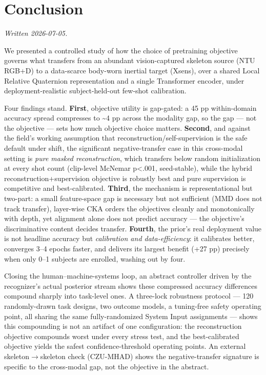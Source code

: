 \section{Conclusion}

\textit{Written 2026-07-05.}

We presented a controlled study of how the choice of pretraining objective governs what transfers from an abundant vision-captured skeleton source (NTU RGB+D) to a data-scarce body-worn inertial target (Xsens), over a shared Local Relative Quaternion representation and a single Transformer encoder, under deployment-realistic subject-held-out few-shot calibration.

Four findings stand. \textbf{First}, objective utility is gap-gated: a 45 pp within-domain accuracy spread compresses to \textasciitilde{}4 pp across the modality gap, so the gap --- not the objective --- sets how much objective choice matters. \textbf{Second}, and against the field's working assumption that reconstruction/self-supervision is the safe default under shift, the significant negative-transfer case in this cross-modal setting is \textit{pure masked reconstruction}, which transfers below random initialization at every shot count (clip-level McNemar p<.001, seed-stable), while the hybrid reconstruction+supervision objective is robustly best and pure supervision is competitive and best-calibrated. \textbf{Third}, the mechanism is representational but two-part: a small feature-space gap is necessary but not sufficient (MMD does not track transfer), layer-wise CKA orders the objectives cleanly and monotonically with depth, yet alignment alone does not predict accuracy --- the objective's discriminative content decides transfer. \textbf{Fourth}, the prior's real deployment value is not headline accuracy but \textit{calibration and data-efficiency}: it calibrates better, converges 3--4 epochs faster, and delivers its largest benefit (+27 pp) precisely when only 0--1 subjects are enrolled, washing out by four.

Closing the human--machine-systems loop, an abstract controller driven by the recognizer's actual posterior stream shows these compressed accuracy differences compound sharply into task-level ones. A three-lock robustness protocol --- 120 randomly-drawn task designs, two outcome models, a tuning-free safety operating point, all sharing the same fully-randomized System Input assignments --- shows this compounding is not an artifact of one configuration: the reconstruction objective compounds worst under every stress test, and the best-calibrated objective yields the safest confidence-threshold operating points. An external skeleton$\rightarrow$skeleton check (CZU-MHAD) shows the negative-transfer signature is specific to the cross-modal gap, not the objective in the abstract.

